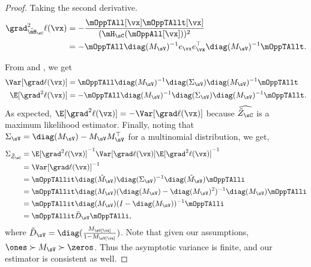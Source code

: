 \begin{proof}
Taking the second derivative.
\begin{align}
  \grad^2_{\tilde \mH_\sC} \ell(\vx)
  &= - \frac{\mOppTAll[\vx] \mOppTAllt[\vx]}{(\mH_\sC(\mOppAll[\vx]))^2} \nonumber \\
  &= - \mOppTAll \diag(M_{\sV})^{-1} e_\vx e_\vx^\top  \diag(M_{\sV})^{-1} \mOppTAllt. \label{eqn:lhood-hess}%
\end{align}

From  and , we get
  \begin{align*}
    \Var [\grad \ell(\vx)] &= \mOppTAll \diag(M_\sV)^{-1} \diag(\Sigma_\sV) \diag(M_\sV)^{-1} \mOppTAllt \\
    \E[\grad^2 \ell(\vx)] &= -\mOppTAll \diag(M_\sV)^{-1} \diag(\Sigma_\sV) \diag(M_\sV)^{-1} \mOppTAllt.
  \end{align*}
As expected, $\E[\grad^2 \ell(\vx)] = -\Var [\grad \ell(\vx)]$ because $\widehat{\tilde Z_\sC}$ is a maximum likelihood estimator. 
Finally, noting that $\Sigma_\sV = \diag(M_\sV) - M_\sV M_\sV^\top$ for
  a multinomial distribution, we get,
\begin{align*}
    \Sigma_{\tilde Z_\sC} 
      &= \E[\grad^2 \ell(\vx)]^{-1} \Var [\grad \ell(\vx)] \E[\grad^2 \ell(\vx)]^{-1} \\
      &= \Var[\grad \ell(\vx)]^{-1} \\
      &= \mOppTAllit \diag(\tilde M_\sV) \diag(\Sigma_\sV)^{-1} \diag(\tilde M_\sV) \mOppTAlli \\
      &= \mOppTAllit \diag(M_\sV) (\diag(M_\sV) - \diag(M_\sV)^2)^{-1} \diag(M_\sV) \mOppTAlli \\
      &= \mOppTAllit \diag(M_\sV) (I - \diag(M_\sV))^{-1} \mOppTAlli \\
      &= \mOppTAllit \tilde D_\sV \mOppTAlli,
\end{align*}
where $\tilde D_\sV = \diag( \frac{M_\sV[\vx]}{1 - M_\sV[\vx]} )$.
Note that given our assumptions, $\ones \succ M_\sV \succ \zeros$. Thus
the asymptotic variance is finite, and our estimator is consistent as
well.


\end{proof}

